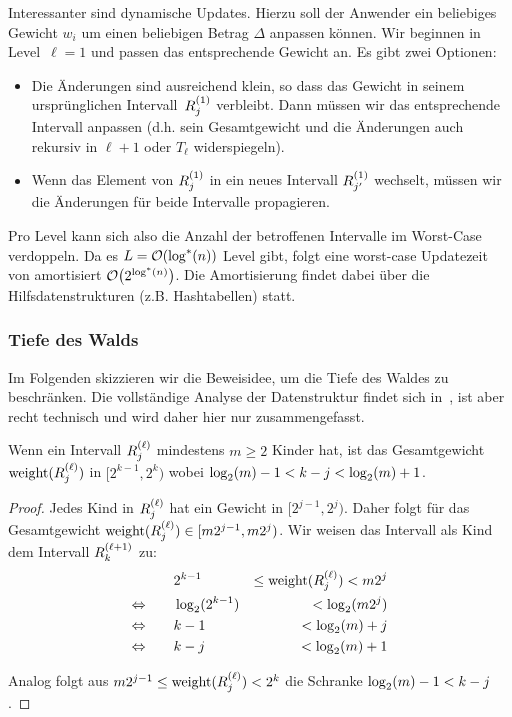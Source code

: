 Interessanter sind dynamische Updates.
Hierzu soll der Anwender ein beliebiges Gewicht $w_i$ um einen beliebigen Betrag $\Delta$ anpassen können.
Wir beginnen in Level~$\ell=1$ und passen das entsprechende Gewicht an.
Es gibt zwei Optionen:
\begin{itemize}
    \item Die Änderungen sind ausreichend klein, so dass das Gewicht in seinem ursprünglichen Intervall~$R^{(1)}_{j}$ verbleibt.
          Dann müssen wir das entsprechende Intervall anpassen (d.h. sein Gesamtgewicht und die Änderungen auch rekursiv in $\ell +1$ oder $T_\ell$ widerspiegeln).


    \item Wenn das Element von $R^{(1)}_{j}$ in ein neues Intervall $R^{(1)}_{j'}$ wechselt, müssen wir die Änderungen für beide Intervalle propagieren.
\end{itemize}

Pro Level kann sich also die Anzahl der betroffenen Intervalle im Worst-Case verdoppeln.
Da es $L = \mathcal{O}\!\left(\log^*(n)\right)$ Level gibt, folgt eine worst-case Updatezeit von amortisiert $\mathcal{O}\!\left(2^{\log^*(n)}\right)$.
Die Amortisierung findet dabei über die Hilfsdatenstrukturen (z.B. Hashtabellen) statt.

\subsubsection{Tiefe des Walds}
Im Folgenden skizzieren wir die Beweisidee, um die Tiefe des Waldes zu beschränken.
Die vollständige Analyse der Datenstruktur findet sich in~\cite{DBLP:journals/mst/MatiasVN03}, ist aber recht technisch und wird daher hier nur zusammengefasst.

\begin{lemma}\label{lem:nachfolger_intervall}
    Wenn ein Intervall $R^{(\ell)}_{j}$ mindestens $m \ge 2$ Kinder hat,
    ist das Gesamtgewicht $\mathrm{weight}(R^{(\ell)}_{j})$ in $[2^{k-1}, 2^k)$ wobei $\log_2(m) - 1 < k - j < \log_2(m) + 1$.
\end{lemma}
\begin{proof}
    Jedes Kind in $R^{(\ell)}_{j}$ hat ein Gewicht in $[2^{j-1}, 2^j)$.
    Daher folgt für das Gesamtgewicht $\mathrm{weight}(R^{(\ell)}_{j}) \in [m2^{j-1}, m2^j)$.
    Wir weisen das Intervall als Kind dem Intervall $R^{(\ell+1)}_{k}$ zu:
    \begin{align}
                               & 2^{k-1}      & \le \mathrm{weight}(R^{(\ell)}_{j}) < m2^j \\
        \Leftrightarrow \qquad & \log_2(2^{k-1}) & < \log_2(m2^{j})             \\
        \Leftrightarrow \qquad & k - 1        & < \log_2(m) + j              \\
        \Leftrightarrow \qquad & k - j        & < \log_2(m) + 1
    \end{align}

    \noindent
    Analog folgt aus $m2^{j-1} \le \mathrm{weight}(R^{(\ell)}_{j}) < 2^k$ die Schranke $\log_2(m) - 1 < k - j$.
\end{proof}


